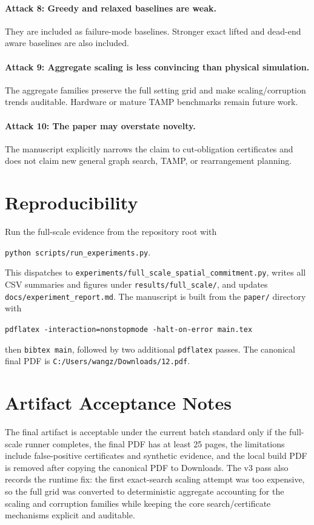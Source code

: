 \documentclass{article}
\begin{document}
\paragraph{Attack 8: Greedy and relaxed baselines are weak.}
They are included as failure-mode baselines. Stronger exact lifted and dead-end aware baselines are also included.

\paragraph{Attack 9: Aggregate scaling is less convincing than physical simulation.}
The aggregate families preserve the full setting grid and make scaling/corruption trends auditable. Hardware or mature TAMP benchmarks remain future work.

\paragraph{Attack 10: The paper may overstate novelty.}
The manuscript explicitly narrows the claim to cut-obligation certificates and does not claim new general graph search, TAMP, or rearrangement planning.

\section{Reproducibility}

Run the full-scale evidence from the repository root with
\begin{center}
\texttt{python scripts/run\_experiments.py}.
\end{center}
This dispatches to \texttt{experiments/full\_scale\_spatial\_commitment.py}, writes all CSV summaries and figures under \texttt{results/full\_scale/}, and updates \texttt{docs/experiment\_report.md}. The manuscript is built from the \texttt{paper/} directory with
\begin{center}
\texttt{pdflatex -interaction=nonstopmode -halt-on-error main.tex}
\end{center}
then \texttt{bibtex main}, followed by two additional \texttt{pdflatex} passes. The canonical final PDF is \texttt{C:/Users/wangz/Downloads/12.pdf}.

\section{Artifact Acceptance Notes}

The final artifact is acceptable under the current batch standard only if the full-scale runner completes, the final PDF has at least 25 pages, the limitations include false-positive certificates and synthetic evidence, and the local build PDF is removed after copying the canonical PDF to Downloads. The v3 pass also records the runtime fix: the first exact-search scaling attempt was too expensive, so the full grid was converted to deterministic aggregate accounting for the scaling and corruption families while keeping the core search/certificate mechanisms explicit and auditable.
\end{document}

